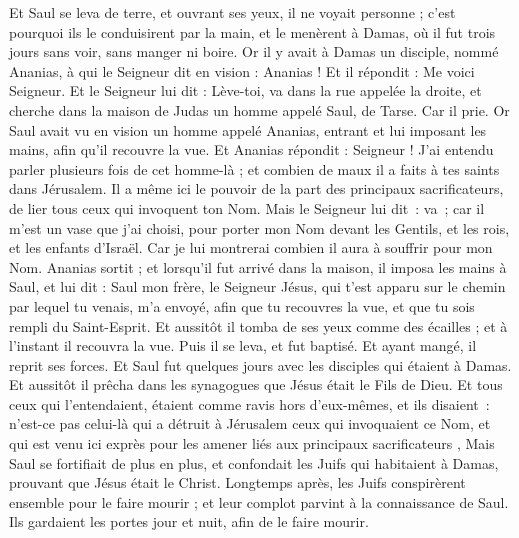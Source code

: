 \begin{multicols}{2}
Et Saul se leva de terre, et ouvrant ses yeux, il ne voyait personne ; c'est pourquoi ils le conduisirent par la main, et le menèrent à Damas,
où il fut trois jours sans voir, sans manger ni boire.
Or il y avait à Damas un disciple, nommé Ananias, à qui le Seigneur dit en vision : Ananias ! Et il répondit : Me voici Seigneur.
Et le Seigneur lui dit : Lève-toi, va dans la rue appelée la droite, et cherche dans la maison de Judas un homme appelé Saul, de Tarse.
Car il prie. Or Saul avait vu en vision un homme appelé Ananias, entrant et lui imposant les mains, afin qu'il recouvre la vue.
Et Ananias répondit : Seigneur ! J'ai entendu parler plusieurs fois de cet homme-là ; et combien de maux il a faits à tes saints dans Jérusalem.
Il a même ici le pouvoir de la part des principaux sacrificateurs, de lier tous ceux qui invoquent ton Nom.
 Mais le Seigneur lui dit : va ; car il m’est un vase que j’ai choisi, pour porter mon Nom devant les Gentils, et les rois, et les enfants d’Israël.
Car je lui montrerai combien il aura à souffrir pour mon Nom.
Ananias sortit ; et lorsqu’il fut arrivé dans la maison, il imposa les mains à Saul, et lui dit : Saul mon frère, le Seigneur Jésus, qui t'est apparu sur le chemin par lequel tu venais, m'a envoyé, afin que tu recouvres la vue, et que tu sois rempli du Saint-Esprit.
Et aussitôt il tomba de ses yeux comme des écailles ; et à l'instant il recouvra la vue. Puis il se leva, et fut baptisé.
Et ayant mangé, il reprit ses forces. Et Saul fut quelques jours avec les disciples qui étaient à Damas.
Et aussitôt il prêcha dans les synagogues que Jésus était le Fils de Dieu.
Et tous ceux qui l’entendaient, étaient comme ravis hors d’eux-mêmes, et ils disaient : n’est-ce pas celui-là qui a détruit à Jérusalem ceux qui invoquaient ce Nom, et qui est venu ici exprès pour les amener liés aux principaux sacrificateurs ,
Mais Saul se fortifiait de plus en plus, et confondait les Juifs qui habitaient à Damas, prouvant que Jésus était le Christ.
Longtemps après, les Juifs conspirèrent ensemble pour le faire mourir ;
et leur complot parvint à la connaissance de Saul. Ils gardaient les portes jour et nuit, afin de le faire mourir.

\end{multicols}
